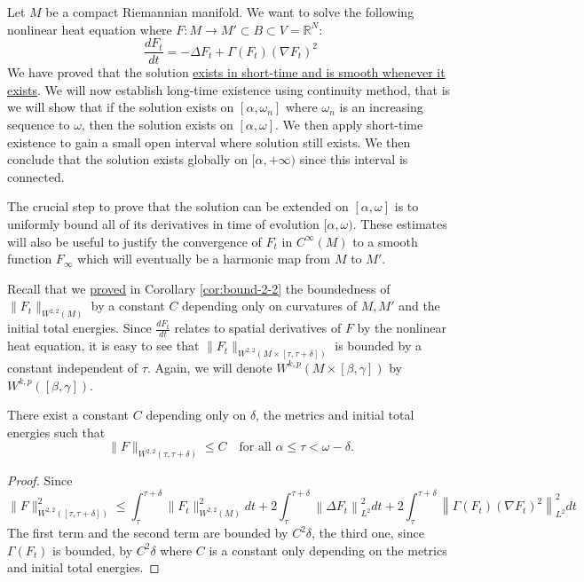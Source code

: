 Let \(M\) be a compact Riemannian manifold. We want to solve the following nonlinear
heat equation where \(F: M \longrightarrow M'\subset
B\subset V = \mathbb{R}^N\):
\[
 \frac{d F_t}{d t} = -\Delta F_t + \Gamma(F_t) (\nabla F_t)^2
\]
We have proved that the solution \href{polynomial-besov.org}{exists in short-time and is
smooth whenever it exists}. We will now establish long-time existence using continuity
method, that is we will show that if the solution exists on \([\alpha,\omega_n]\) where
\(\omega_n\) is an increasing sequence to \(\omega\), then the solution exists on \([\alpha,\omega]\). We then apply short-time existence to gain a small open interval where
solution still exists. We then conclude that the solution exists globally on \([\alpha,+\infty)\) since this interval is connected.

The crucial step to prove that the solution can be extended on \([\alpha,\omega]\) is to
uniformly bound all of its derivatives in time of evolution \([\alpha,\omega)\). These
estimates will also be useful to justify the convergence of \(F_t\) in \(C^\infty(M)\) to a smooth function \(F_\infty\) which will eventually be a harmonic map
from \(M\) to \(M'\).

Recall that we \href{harmonic-maps.org}{proved} in Corollary \ref{cor:bound-2-2} the boundedness of \(\|F_t\|_{W^{2,2}(M)}\) by a constant \(C\) depending only on curvatures of \(M, M'\) and
the initial total energies. Since \(\frac{dF_t}{dt }\) relates to spatial derivatives of
\(F\) by the nonlinear heat equation, it is easy to see that \(\|F_t\|_{W^{2,2}(M\times[\tau,\tau +\delta])}\) is bounded by a constant independent of
\(\tau\). Again, we will denote \(W^{k,p}(M\times [\beta,\gamma])\) by \(W^{k,p}([\beta,\gamma])\).

\begin{theorem}[\(W^{2,2}\)-boundedness]
\label{thm:bound-2-2}
There exist a constant \(C\) depending only on \(\delta\), the metrics and initial
total energies such that
\[
 \|F\|_{W^{2,2}(\tau,\tau+\delta)}\leq C\quad\text{for all } \alpha \leq \tau <\omega-\delta.
\]
\end{theorem}
\begin{proof}
Since 
\[ \|F\|^2_{W^{2,2}([\tau,\tau+\delta])} \leq \int_\tau^{\tau+\delta}
\|F_t\|^2_{W^{2,2}(M)} dt + 2\int_\tau^{\tau+\delta} \left\| \Delta F_t
\right\|^2_{L^2}dt + 2\int_\tau^{\tau+\delta} \left\| \Gamma(F_t)(\nabla F_t)^2
\right\|^2_{L^2}dt
\]
The first term and the second term are bounded by \(C^2\delta\), the third one, since \(\Gamma(F_t)\) is bounded, by \(C^2\delta\) where \(C\) is a constant only depending on
the metrics and initial total energies.
\end{proof}

